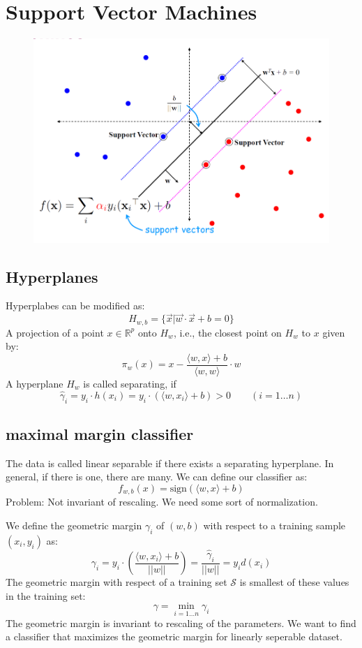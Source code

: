 \section{Support Vector Machines}
\begin{figure}[!h]
    \includegraphics[width = \columnwidth]{figures/08/SVM.png}
\end{figure}
\subsection{Hyperplanes}
Hyperplabes can be modified as:
\[
H_{w,b} = \{\vec{x}|\vec{w}\cdot\vec{x} + b = 0\}
\]
A projection of a point \(x \in \mathbb{R}^p\) onto \(H_w\), i.e., the closest point on \(H_w\) to \(x\) given by:
\[
\pi_w(x) = x-\frac{\langle w,x \rangle + b}{\langle w,w \rangle}\cdot w
\]
A hyperplane \(H_w\) is called separating, if 
\[
\hat{\gamma}_i = y_i \cdot h(x_i) = y_i \cdot (\langle w,x_i \rangle + b) > 0\qquad(i = 1\dots n)
\]
\subsection{maximal margin classifier}
The data is called linear separable if there exists a separating hyperplane.
In general, if there is one, there are many.
We can define our classifier as:
\[
f_{w,b}(x) = \text{sign}(\langle w,x\rangle + b)
\]
Problem: Not invariant of rescaling.
We need some sort of normalization.

We define the geometric margin \(\gamma_i\) of \((w,b)\) with respect to a training sample \((x_i,y_i)\) as:
\[
\gamma_i = y_i \cdot \left(\frac{\langle w,x_i \rangle + b}{||w||}\right) = \frac{\hat{\gamma}_i}{||w||} = y_i d(x_i)
\]
The geometric margin with respect of a training set \(\mathcal{S}\) is smallest of these values in the training set:
\[
\gamma = \min_{i = 1 \dots
n} \gamma_i
\]
The geometric margin is invariant to rescaling of the parameters.
We want to find a classifier that maximizes the geometric margin for linearly seperable dataset.

